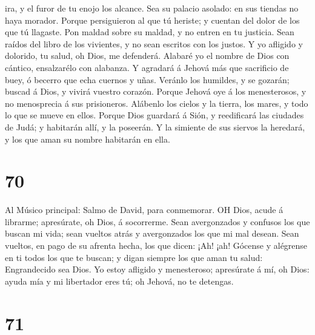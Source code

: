ira, y el furor de tu enojo los alcance.  Sea su palacio
asolado: en sus tiendas no haya morador.  Porque
persiguieron al que tú heriste; y cuentan del dolor de los que tú
llagaste.  Pon maldad sobre su maldad, y no entren en tu
justicia.  Sean raídos del libro de los vivientes, y no
sean escritos con los justos.  Y yo afligido y dolorido, tu
salud, oh Dios, me defenderá.  Alabaré yo el nombre de Dios
con cántico, ensalzarélo con alabanza.  Y agradará á Jehová
más que sacrificio de buey, ó becerro que echa cuernos y uñas.
 Veránlo los humildes, y se gozarán; buscad á Dios, y
vivirá vuestro corazón.  Porque Jehová oye á los
menesterosos, y no menosprecia á sus prisioneros.  Alábenlo
los cielos y la tierra, los mares, y todo lo que se mueve en ellos.
 Porque Dios guardará á Sión, y reedificará las ciudades de
Judá; y habitarán allí, y la poseerán.  Y la simiente de
sus siervos la heredará, y los que aman su nombre habitarán en ella.

\hypertarget{section-69}{%
\section{70}\label{section-69}}

 Al Músico principal: Salmo de David, para conmemorar. OH
Dios, acude á librarme; apresúrate, oh Dios, á socorrerme. 
Sean avergonzados y confusos los que buscan mi vida; sean vueltos atrás
y avergonzados los que mi mal desean.  Sean vueltos, en pago
de su afrenta hecha, los que dicen: ¡Ah! ¡ah!  Gócense y
alégrense en ti todos los que te buscan; y digan siempre los que aman tu
salud: Engrandecido sea Dios.  Yo estoy afligido y
menesteroso; apresúrate á mí, oh Dios: ayuda mía y mi libertador eres
tú; oh Jehová, no te detengas.

\hypertarget{section-70}{%
\section{71}\label{section-70}}


